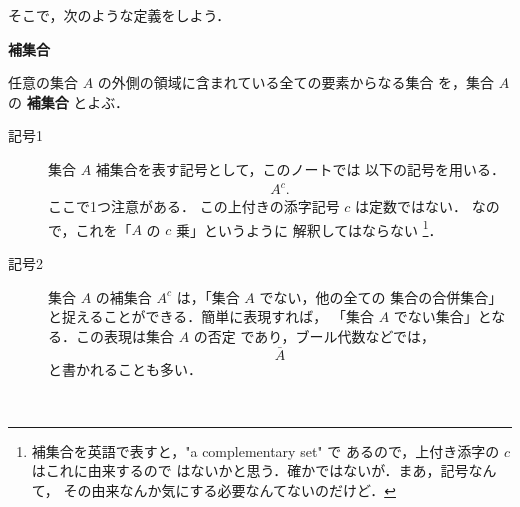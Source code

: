                     そこで，次のような定義をしよう．
                    \\
                    \begin{itembox}[l]{\textbf{補集合}}
                        \begin{dfn}
                            任意の集合 $A$ の外側の領域に含まれている全ての要素からなる集合
                            を，集合 $A$ の \textbf{補集合} とよぶ．
                            \begin{description}
                                \item[記号1] 集合 $A$  補集合を表す記号として，このノートでは
                                            以下の記号を用いる．
                                                \begin{align}
                                                        A^{c}.
                                                \end{align}
                                             ここで1つ注意がある．
                                             この上付きの添字記号 $c$ は定数ではない．
                                             なので，これを「$A$ の $c$ 乗」というように
                                             解釈してはならない
                                                \footnote{
                                                    補集合を英語で表すと，"a complementary set" で
                                                    あるので，上付き添字の $c$ はこれに由来するので
                                                    はないかと思う．確かではないが．まあ，記号なんて，
                                                    その由来なんか気にする必要なんてないのだけど．
                                                }．
                                \item[記号2] 集合 $A$ の補集合 $A^{c}$ は，「集合 $A$ でない，他の全ての
                                             集合の合併集合」と捉えることができる．簡単に表現すれば，
                                             「集合 $A$ でない集合」となる．この表現は集合 $A$ の否定
                                             であり，ブール代数などでは，
                                                \begin{equation*}
                                                    \bar{A}
                                                \end{equation*}
                                             と書かれることも多い．
                            \end{description}
                        \end{dfn}
                    \end{itembox}
                    \\


